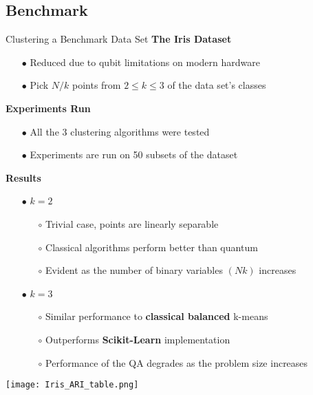 	\subsection{Benchmark}
	\begin{frame}[allowframebreaks]{Clustering a Benchmark Data Set}
		\textbf{The Iris Dataset}
		\begin{itemize}
			\item[$\bullet$] Reduced due to qubit limitations on modern hardware
			\item[$\bullet$] Pick $N/k$ points from $2\leq k \leq3$ of the data set's classes
		\end{itemize}
	
		\textbf{Experiments Run}
		\begin{itemize}
			\item[$\bullet$] All the 3 clustering algorithms were tested
			\item[$\bullet$] Experiments are run on 50 subsets of the dataset
		\end{itemize}
	
		\textbf{Results}
		\begin{itemize}
			\item[$\bullet$] $k=2$
			\begin{itemize}
				\item[$\circ$] Trivial case, points are linearly separable
				\item[$\circ$] Classical algorithms perform better than quantum
				\item[$\circ$] Evident as the number of binary variables $(Nk)$ increases
			\end{itemize}
		
			\framebreak
			\item[$\bullet$] $k=3$
			\begin{itemize}
				\item[$\circ$] Similar performance to \textbf{classical balanced} k-means
				\item[$\circ$] Outperforms \textbf{Scikit-Learn} implementation
				\item[$\circ$] Performance of the QA degrades as the problem size increases
			\end{itemize}
		\end{itemize}
		\begin{center}
			\texttt{[image: Iris\_ARI\_table.png]}
		\end{center}
	\end{frame}
